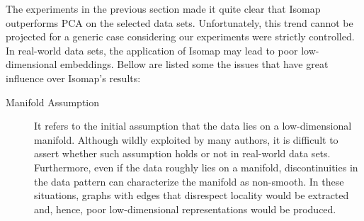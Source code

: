 \documentclass[12pt]{article}
\begin{document}
The experiments in the previous section made it quite clear that Isomap outperforms PCA on the selected data sets. Unfortunately, this trend cannot be projected for a generic case considering our experiments were strictly controlled. In real-world data sets, the application of Isomap may lead to poor low-dimensional embeddings. \cite{herik2009} Bellow are listed some the issues that have great influence over Isomap's results:
\begin{description}
	\item[Manifold Assumption] It refers to the initial assumption that the data lies on a low-dimensional manifold. Although wildly exploited by many authors, it is difficult to assert whether such assumption holds or not in real-world data sets. \cite{lin2008riemannian} Furthermore, even if the data roughly lies on a manifold, discontinuities in the data pattern can characterize the manifold as non-smooth. In these situations, graphs with edges that disrespect locality would be extracted and, hence, poor low-dimensional representations would be produced.
	

\end{description}
\end{document}
